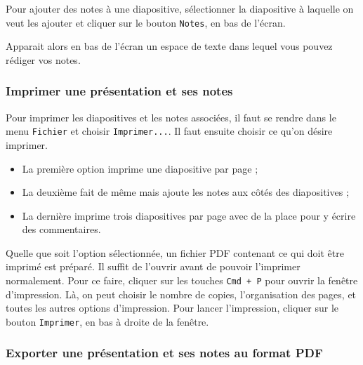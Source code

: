 Pour ajouter des notes à une diapositive, sélectionner la diapositive à laquelle on veut les ajouter et cliquer sur le bouton \texttt{Notes}, en bas de l'écran.


Apparait alors en bas de l'écran un espace de texte dans lequel vous pouvez rédiger vos notes.



\subsubsection{Imprimer une présentation et ses notes}\label{Presentation1export}

Pour imprimer les diapositives et les notes associées, il faut se rendre dans le menu \texttt{Fichier} et choisir \texttt{Imprimer...}.  Il faut ensuite choisir ce qu'on désire imprimer.

\begin{itemize}
	\item La première option imprime une diapositive par page  ;
	\item La deuxième fait de même mais ajoute les notes aux côtés des diapositives  ;
	\item La dernière imprime trois diapositives par page avec de la place pour y écrire des commentaires. 
\end{itemize}


Quelle que soit l'option sélectionnée, un fichier PDF contenant ce qui doit être imprimé est préparé. Il suffit de l'ouvrir avant de pouvoir l'imprimer normalement. Pour ce faire, cliquer sur les touches \texttt{Cmd + P} pour ouvrir la fenêtre d'impression. Là, on peut choisir le nombre de copies, l'organisation des pages, et toutes les autres options d'impression. Pour lancer l'impression, cliquer sur le bouton \texttt{Imprimer}, en bas à droite de la fenêtre.



\subsubsection{Exporter une présentation et ses notes au format PDF}\label{Presentation1exportPDF}


